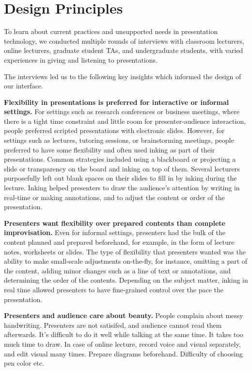 \section{Design Principles}
To learn about current practices and unsupported needs in presentation technology, we conducted multiple rounds of interviews with classroom lecturers, online lecturers, graduate student TAs, and undergraduate students, with varied experiences in giving and listening to presentations. 

The interviews led us to the following key insights which informed the design of our interface.

\textbf{Flexibility in presentations is preferred for interactive or informal settings.} For settings such as research conferences or business meetings, where there is a tight time constraint and little room for presenter-audience interaction, people preferred scripted presentations with electronic slides. However, for settings such as lectures, tutoring sessions, or brainstorming meetings, people preferred to have some flexibility and often used inking as part of their presentations. Common strategies included using a blackboard or projecting a slide or transparency on the board and inking on top of them. Several lecturers purposefully left out blank spaces on their slides to fill in by inking during the lecture. Inking helped presenters to draw the audience's attention by  writing in real-time or making annotations, and to adjust the content or order of the presentation. 

\textbf{Presenters want flexibility over prepared contents than complete improvisation.} Even for informal settings, presenters had the bulk of the content planned and prepared beforehand, for example, in the form of lecture notes, worksheets or slides. The type of flexibility that presenters wanted was the ability to make small-scale adjustments on-the-fly, for instance, omitting a part of the content, adding minor changes such as a line of text or annotations, and determining the order of the contents. Depending on the subject matter, inking in real time allowed presenters to have fine-grained control over the pace the presentation.  

\textbf{Presenters and audience care about beauty.} People complain about messy handwriting. Presenters are not satisifed, and audience cannot read them afterwards. It's difficult to do it well while talking at the same time. It takes too much time to draw. In case of online lecture, record voice and visual separately, and edit visual many times. Prepare diagrams beforehand. Difficulty of choosing pen color etc.

